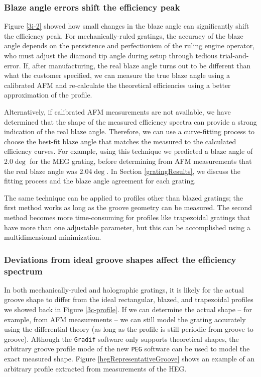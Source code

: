 \subsubsection{Blaze angle errors shift the efficiency peak}
Figure \ref{3i-2} showed how small changes in the blaze angle can significantly shift the efficiency peak.  For mechanically-ruled gratings, the accuracy of the blaze angle depends on the persistence and perfectionism of the ruling engine operator, who must adjust the diamond tip angle during setup through tedious trial-and-error.  If, after manufacturing, the real blaze angle turns out to be different than what the customer specified, we can measure the true blaze angle using a calibrated AFM and re-calculate the theoretical efficiencies using a better approximation of the profile.

Alternatively, if calibrated AFM measurements are not available, we have determined that the shape of the measured efficiency spectra 
can provide a strong indication of the real blaze angle.  Therefore, we can use a curve-fitting process to choose the best-fit blaze angle that matches the measured to the calculated efficiency curves.  For example, using this technique we predicted a blaze angle of 2.0$\deg$ for the MEG grating, before determining from AFM measurements that the real blaze angle was 2.04$\deg$.  In Section \ref{gratingResults}, we discuss the fitting process and the blaze angle agreement for each grating.

The same technique can be applied to profiles other than blazed gratings; the first method works as long as the groove geometry can be measured.  The second method becomes more time-consuming for profiles like trapezoidal gratings that have more than one adjustable parameter, but this can be accomplished using a multidimensional minimization.

\subsubsection{Deviations from ideal groove shapes affect the efficiency spectrum}
In both mechanically-ruled and holographic gratings, it is likely for the actual groove shape to differ from the ideal rectangular, blazed, and trapezoidal profiles we showed back in Figure \ref{3c-profile}.  If we can determine the actual shape -- for example, from AFM measurements -- we can still model the grating accurately using the differential theory (as long as the profile is still periodic from groove to groove).  Although the \texttt{Gradif} software only supports theoretical shapes, the arbitrary groove profile mode of the new \texttt{PEG} software can be used to model the exact measured shape.  Figure \ref{hegRepresentativeGroove} shows an example of an arbitrary profile extracted from measurements of the HEG.

